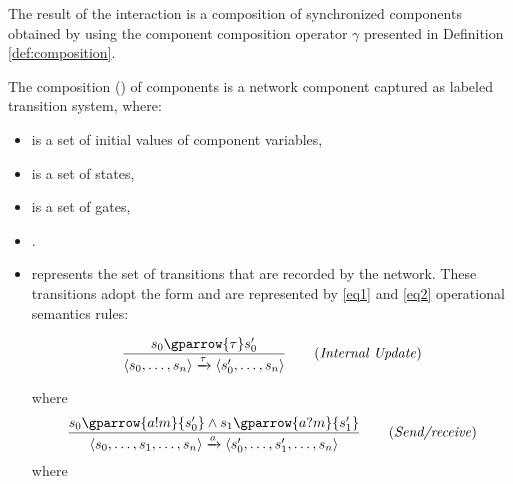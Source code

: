 The result of the interaction is a composition of synchronized components obtained by using the component composition operator  $\gamma$  presented in Definition \ref{def:composition}.


\begin{mydef}[Composition]\label{def:composition} The composition \emath{\gamma} () of   components is a network component  captured as labeled transition system, where:
\begin{itemize}
    \item {} is a set of initial values of component variables,
    \item {} is a set of states,
    \item {} is a set of gates,
	\item {}.
   \item {} represents the set of transitions that are recorded by the network. These transitions adopt the form  and are represented by \ref{eq1}  and \ref{eq2} operational semantics rules:

   \begin{equation}\frac{ s_{0} \gparrow{\tau} s'_{0}} { \langle s_{0},\ldots,s_{n}\rangle \xrightarrow{\tau}\langle s'_{0},\ldots,s_{n}\rangle  } \label{eq1} \tag{\emph{Internal Update}} 
   \end{equation}
   
   where   
   \begin{equation}\frac{ s_{0} \gparrow{a!m} {s'_{0}} \wedge s_{1} \gparrow{a?m} {s'_{1}} } { \langle s_{0},\ldots, s_{1}, \ldots,s_{n}\rangle \xrightarrow{a}\langle s'_{0},\ldots, s'_{1},\ldots,s_{n}\rangle  } \label{eq2} \tag{\emph{Send/receive}} \end{equation}
              where   
\end{itemize}
\end{mydef}